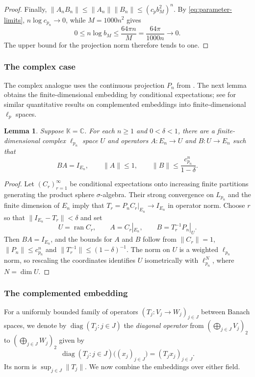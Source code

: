 \documentclass[11pt,a4paper,reqno]{amsart}
\newtheorem{lemma}[lemma]{Lemma}
\theoremstyle{definition}
\newcommand{\C}{\mathbb C}
\newcommand{\norm}[1]{\lVert #1\rVert}
\DeclareMathOperator{\diag}{diag}
\DeclareMathOperator{\ran}{ran}
\numberwithin{equation}{section}
\begin{document}
\begin{proof}
Finally, $\norm{A_nB_n}\leq\norm{A_n}\norm{B_n}\leq(c_pb_M^2)^n$. By \eqref{eq:parameter-limits}, $n\log c_{p_n}\to0$, while $M=1000n^2$ gives
\begin{equation*}
 0\leq n\log b_M\leq\frac{64\pi n}{M}=\frac{64\pi}{1000n}\longrightarrow0.
\end{equation*}
The upper bound for the projection norm therefore tends to one.
\end{proof}

\subsubsection{The complex case}
The complex analogue uses the continuous projection $P_n$ from . The next lemma obtains the finite-dimensional embedding by conditional expectations; see \cite[Section~5.1, Theorem~33]{JohnsonSchechtman2001} for similar quantitative results on complemented embeddings into finite-dimensional $\ell_p$ spaces.

\begin{lemma}\label{lem:complex-sampling}
Suppose $\mathbb K=\C$. For each $n\geq1$ and $0<\delta<1$, there are a finite-dimensional complex $\ell_{p_n}$ space $U$ and operators $A\colon E_n\to U$ and $B\colon U\to E_n$ such that
\begin{equation*}
 BA=I_{E_n},\qquad \norm A\leq1,\qquad
 \norm B\leq\frac{c_{p_n}^n}{1-\delta}.
\end{equation*}
\end{lemma}

\begin{proof}
Let $(C_r)_{r=1}^{\infty}$ be conditional expectations onto increasing finite partitions generating the product sphere $\sigma$-algebra. Their strong convergence on $L_{p_n}$ and the finite dimension of $E_n$ imply that $T_r=P_nC_r|_{E_n}\to I_{E_n}$ in operator norm. Choose $r$ so that $\norm{I_{E_n}-T_r}<\delta$ and set
\begin{equation*}
 U=\ran C_r,\qquad A=C_r|_{E_n},\qquad B=T_r^{-1}P_n|_U.
\end{equation*}
Then $BA=I_{E_n}$, and the bounds for $A$ and $B$ follow from $\norm{C_r}=1$, $\norm{P_n}\leq c_{p_n}^n$ and $\norm{T_r^{-1}}\leq(1-\delta)^{-1}$. The norm on $U$ is a weighted $\ell_{p_n}$ norm, so rescaling the coordinates identifies $U$ isometrically with $\ell_{p_n}^{N}$, where $N=\dim U$.
\end{proof}

\subsubsection{The complemented embedding}\label{sec:complemented-embedding}
For a uniformly bounded family of operators $(T_j\colon V_j\to W_j)_{j\in J}$ between Banach spaces, we denote by $\diag(T_j:j\in J)$ the \emph{diagonal operator} from $(\bigoplus_{j\in J}V_j)_2$ to $(\bigoplus_{j\in J}W_j)_2$ given by
\begin{equation*}
 \diag(T_j:j\in J)\bigl((x_j)_{j\in J}\bigr)=(T_jx_j)_{j\in J}.
\end{equation*}
Its norm is $\sup_{j\in J}\norm{T_j}$. We now combine the embeddings over either field.
\end{document}
